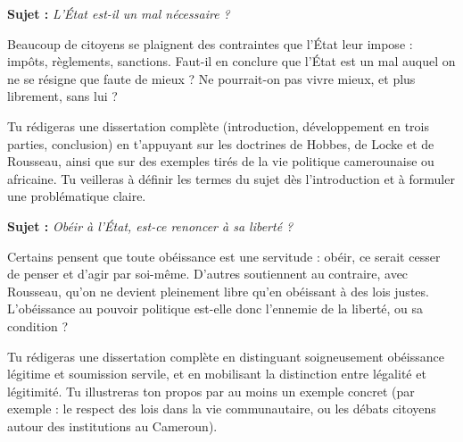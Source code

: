 \documentclass[11pt]{article}
\newcounter{popsec}
\newcounter{popsub}
\newcommand{\courssub}[1]{%
  \stepcounter{popsub}%
  \par\vspace{9pt}\noindent{\popxbold\fontsize{11.5}{13}\selectfont\color{popink}{\color{poporange}\thepopsec.\thepopsub}\hspace{6pt}#1}\par\nopagebreak\vspace{4pt}
}
\begin{document}
\courssub{Je me prépare au Bac}

\begin{exercice}
\textbf{Sujet :} \emph{L'État est-il un mal nécessaire ?}

Beaucoup de citoyens se plaignent des contraintes que l'État leur impose : impôts, règlements, sanctions. Faut-il en conclure que l'État est un mal auquel on ne se résigne que faute de mieux ? Ne pourrait-on pas vivre mieux, et plus librement, sans lui ?

Tu rédigeras une dissertation complète (introduction, développement en trois parties, conclusion) en t'appuyant sur les doctrines de Hobbes, de Locke et de Rousseau, ainsi que sur des exemples tirés de la vie politique camerounaise ou africaine. Tu veilleras à définir les termes du sujet dès l'introduction et à formuler une problématique claire.
\end{exercice}

\begin{exercice}
\textbf{Sujet :} \emph{Obéir à l'État, est-ce renoncer à sa liberté ?}

Certains pensent que toute obéissance est une servitude : obéir, ce serait cesser de penser et d'agir par soi-même. D'autres soutiennent au contraire, avec Rousseau, qu'on ne devient pleinement libre qu'en obéissant à des lois justes. L'obéissance au pouvoir politique est-elle donc l'ennemie de la liberté, ou sa condition ?

Tu rédigeras une dissertation complète en distinguant soigneusement obéissance légitime et soumission servile, et en mobilisant la distinction entre légalité et légitimité. Tu illustreras ton propos par au moins un exemple concret (par exemple : le respect des lois dans la vie communautaire, ou les débats citoyens autour des institutions au Cameroun).
\end{exercice}
\end{document}
